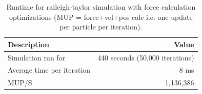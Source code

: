 \documentclass{article}
\begin{document}
\begin{table}[h!]
    \centering
    \begin{tabular}{|l|r|}
        \hline
        \textbf{Description} & \textbf{Value} \\ \hline
        Simulation ran for & 440 seconds (50,000 iterations) \\ \hline
        Average time per iteration & 8 ms \\ \hline
        MUP/S & 1,136,386 \\ \hline
    \end{tabular}
    \caption{Runtime for raileigh-taylor simulation with force calculation optimizations (MUP = force+vel+pos calc i.e. one update per particle per iteration).}
    \label{table:raileigh_calc}
\end{table}
\end{document}
